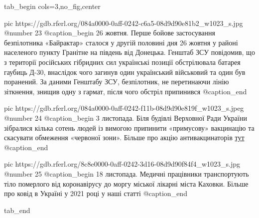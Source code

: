  
 
 
 
 


\ifcmt
  tab_begin cols=3,no_fig,center

     pic https://gdb.rferl.org/084a0000-0aff-0242-c6a5-08d9d90e81b2_w1023_s.jpg
		 @number 23
		 @caption_begin
26 жовтня. Перше бойове застосування безпілотника «Байрактар» сталося у другій
половині дня 26 жовтня у районі населеного пункту Гранітне на південь від
Донецька. Генштаб ЗСУ повідомив, що з території російських гібридних сил
українські позиції обстрілювала батарея гаубиць Д-30, внаслідок чого загинув
один український військовий та один був поранений. За даними Генштабу ЗСУ,
безпілотник, не перетинаючи лінію зіткнення, знищив одну з гармат, після чого
обстріл припинився
		 @caption_end

		 pic https://gdb.rferl.org/084a0000-0aff-0242-f11b-08d9d90e819f_w1023_s.jpeg
		 @number 24
		 @caption_begin
3 листопада. Біля будівлі Верховної Ради України зібралися кілька сотень людей
із вимогою припинити «примусову» вакцинацію та скасувати обмеження «червоної
зони». Більше про акцію антивакцинаторів
\href{https://www.radiosvoboda.org/a/antyvakcynatory-zibralysia-pid-parlamentom-foto/31544278.html}{тут}
		 @caption_end

		 pic https://gdb.rferl.org/8c8e0000-0aff-0242-3d16-08d9d90f84f4_w1023_s.jpg
		 @number 25
		 @caption_begin
18 листопада. Медичні працівники транспортують тіло померлого від коронавірусу
до моргу міської лікарні міста Каховки. Більше про ковід в Україні у 2021 році
у наші статті
		 @caption_end

  tab_end
\fi
